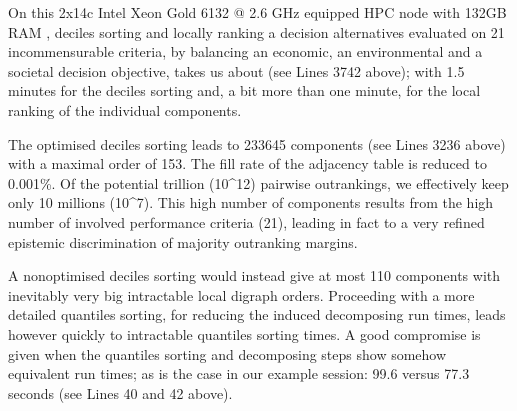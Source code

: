 \documentclass[a4paper,10pt,english]{sphinxhowto}
\begin{document}
\begin{sphinxVerbatim}[commandchars=\\\{\},numbers=left,firstnumber=1,stepnumber=1]
           
\end{sphinxVerbatim}

On this 2x14c Intel Xeon Gold 6132 @ 2.6 GHz equipped HPC node with 132GB RAM \sphinxfootnotemark[7], deciles sorting and locally ranking a  decision alternatives evaluated on 21 incommensurable criteria, by balancing an economic, an environmental and a societal decision objective, takes us about  (see Lines 37\sphinxhyphen{}42 above); with 1.5 minutes for the deciles sorting and, a bit more than one minute, for the local ranking of the individual components.

The optimised deciles sorting leads to 233645 components (see Lines 32\sphinxhyphen{}36 above) with a maximal order of 153. The fill rate of the adjacency table is reduced to 0.001\%. Of the potential trillion (10\textasciicircum{}12) pairwise outrankings, we effectively keep only 10 millions (10\textasciicircum{}7). This high number of components results from the high number of involved performance criteria (21), leading in fact to a very refined epistemic discrimination of majority outranking margins.

A non\sphinxhyphen{}optimised deciles sorting would instead give at most 110 components with inevitably very big intractable local digraph orders. Proceeding with a more detailed quantiles sorting, for reducing the induced decomposing run times, leads however quickly to intractable quantiles sorting times. A good compromise is given when the quantiles sorting and decomposing steps show somehow equivalent run times; as is the case in our example session: 99.6 versus 77.3 seconds (see Lines 40 and 42 above).
\end{document}
